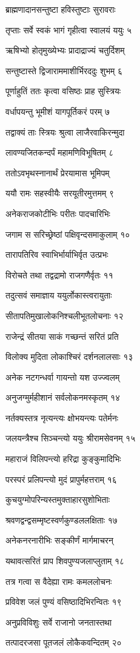 ब्राह्मणादानसन्तुष्टा हविस्तुष्टाः सुरावराः

तृप्ताः सर्वे स्वकं भागं गृहीत्वा स्वालयं ययुः ५

ऋषिभ्यो होतृमुख्येभ्यः प्रादाद्राज्यं चतुर्दिशम्

सन्तुष्टास्ते द्विजाराममाशीर्भिरददुः शुभम् ६

पूर्णाहुतिं ततः कृत्वा वसिष्ठः प्राह सुस्त्रियः

वर्धापयन्तु भूमीशं यागपूर्तिकरं परम् ७

तद्वाक्यं ताः स्त्रियः श्रुत्वा लाजैरवाकिरन्मुदा

लावण्यजितकन्दर्पं महामणिविभूषितम् ८

ततोऽवभृथस्नानार्थं प्रेरयामास भूमिपम्

ययौ रामः सहस्वीयैः सरयूतीरमुत्तमम् ९

अनेकराजकोटीभिः परीतः पादचारिभिः

जगाम स सरिच्छ्रेष्ठां पक्षिवृन्दसमाकुलाम् १०

तारापतिरिव स्वाभिर्भार्याभिर्वृत उत्प्रभः

विरोचते तथा तद्वद्रामो राजगणैर्वृतः ११

तदुत्सवं समाज्ञाय ययुर्लोकास्त्वरायुताः

सीतापतिमुखालोकनिश्चलीभूतलोचनाः १२

राजेन्द्रं सीतया साकं गच्छन्तं सरितं प्रति

विलोक्य मुदिता लोकाश्चिरं दर्शनलालसाः १३

अनेक नटगन्धर्वा गायन्तो यश उज्ज्वलम्

अनुजग्मुर्महीशानं सर्वलोकनमस्कृतम् १४

नर्तक्यस्तत्र नृत्यन्त्यः क्षोभयन्त्यः पतेर्मनः

जलयन्त्रैश्च सिञ्चन्त्यो ययुः श्रीरामसेवनम् १५

महाराजं विलिपन्त्यो हरिद्रा कुङ्कुमादिभिः

परस्परं प्रलिपन्त्यो मुदं प्रापुर्महत्तराम् १६

कुचयुग्मोपरिन्यस्तमुक्ताहारसुशोभिताः

श्रवणद्वन्द्वसम्मृष्टस्वर्णकुण्डललक्षिताः १७

अनेकनरनारीभिः सङ्कीर्णं मार्गमाचरन्

यथावत्सरितं प्राप शिवपुण्यजलाप्लुताम् १८

तत्र गत्वा स वैदेह्या रामः कमललोचनः

प्रविवेश जलं पुण्यं वसिष्ठादिभिरन्वितः १९

अनुप्रविविशुः सर्वे राजानो जनतास्तथा

तत्पादरजसा पूतजलं लोकैकवन्दितम् २०

